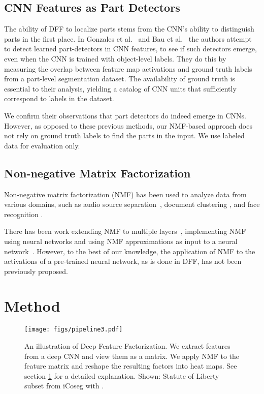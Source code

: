 \documentclass[runningheads]{llncs}
\begin{document}
	\subsection{CNN Features as Part Detectors}
	The ability of DFF to localize parts stems from the CNN's ability to distinguish parts in the first place. In Gonzales et al.~\cite{Gonzalez2017} and Bau et al.~\cite{Bau2017} the authors attempt to detect learned part-detectors in CNN features, to see if such detectors emerge, even when the CNN is trained with object-level labels. They do this by measuring the overlap between feature map activations and ground truth labels from a part-level segmentation dataset. The availability of ground truth is essential to their analysis, yielding a catalog of CNN units that sufficiently correspond to labels in the dataset.

	 We confirm their observations that part detectors do indeed emerge in CNNs. However, as opposed to these  previous methods, our NMF-based approach does not rely on ground truth labels to find the parts in the input. We use labeled data for evaluation only.
	 
	 
	 \subsection{Non-negative Matrix Factorization}
	 Non-negative matrix factorization (NMF) has been used to analyze data from various domains, such as audio source separation~\cite{grais2011single}, document clustering \cite{xu2003document}, and face recognition \cite{guillamet2002non}.
	 
	 There has been work extending NMF to multiple layers~\cite{cichocki2006multilayer}, implementing NMF using neural networks \cite{dziugaite2015neural} and using NMF approximations as input to a neural network~\cite{vu2016combining}. However, to the best of our knowledge, the application of NMF to the activations of a pre-trained neural network, as is done in DFF, has not been previously proposed.

	
	\section{Method} \label{sec:Method}
	
	\begin{figure}[t]
		\centering
		\texttt{[image: figs/pipeline3.pdf]}
		\caption{An illustration of Deep Feature Factorization. We extract features from a deep CNN and view them as a matrix. We apply NMF to the feature matrix and reshape the resulting  factors into  heat maps. See section \ref{sec:Method} for a detailed explanation. Shown: Statute of Liberty subset from iCoseg with .} \label{fig:pipeline}
	\end{figure}
	
\end{document}
